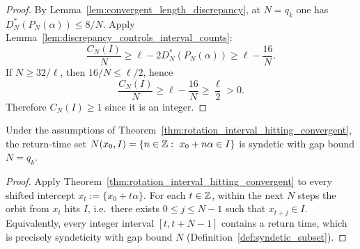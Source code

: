 \begin{proof}
By Lemma~\ref{lem:convergent_length_discrepancy}, at $N=q_k$ one has
$D_N^\ast(P_N(\alpha))\le 8/N$.
Apply Lemma~\ref{lem:discrepancy_controls_interval_counts}:
\[
\frac{C_N(I)}{N}\ge \ell-2D_N^\ast(P_N(\alpha))
\ge \ell-\frac{16}{N}.
\]
If $N\ge 32/\ell$, then $16/N\le \ell/2$, hence
\[
\frac{C_N(I)}{N}\ge \ell-\frac{16}{N}\ge \frac{\ell}{2}>0.
\]
Therefore $C_N(I)\ge 1$ since it is an integer.
\end{proof}

\begin{corollary}\label{cor:rotation_interval_syndetic_gap}
\MathTag Under the assumptions of Theorem~\ref{thm:rotation_interval_hitting_convergent}, the return-time set
$N(x_0,I)=\{n\in\ZZ:\ x_0+n\alpha\in I\}$ is syndetic with gap bound $N=q_k$.
\end{corollary}

\begin{proof}
Apply Theorem~\ref{thm:rotation_interval_hitting_convergent} to every shifted intercept $x_t:=\{x_0+t\alpha\}$.
For each $t\in\mathbb{Z}$, within the next $N$ steps the orbit from $x_t$ hits $I$, i.e.\ there exists $0\le j\le N-1$ such that $x_{t+j}\in I$.
Equivalently, every integer interval $[t,t+N-1]$ contains a return time, which is precisely syndeticity with gap bound $N$ (Definition~\ref{def:syndetic_subset}).
\end{proof}

